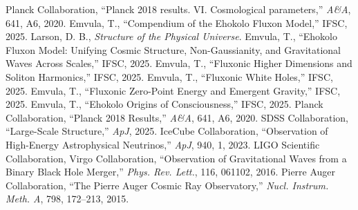 \documentclass[11pt]{article}
\begin{document}
\begin{thebibliography}{99}
 Planck Collaboration, ``Planck 2018 results. VI. Cosmological parameters,'' \textit{A\&A}, 641, A6, 2020.
 Emvula, T., ``Compendium of the Ehokolo Fluxon Model,'' IFSC, 2025.
 Larson, D. B., \textit{Structure of the Physical Universe}.
 Emvula, T., ``Ehokolo Fluxon Model: Unifying Cosmic Structure, Non-Gaussianity, and Gravitational Waves Across Scales,'' IFSC, 2025.
 Emvula, T., ``Fluxonic Higher Dimensions and Soliton Harmonics,'' IFSC, 2025.
 Emvula, T., ``Fluxonic White Holes,'' IFSC, 2025.
 Emvula, T., ``Fluxonic Zero-Point Energy and Emergent Gravity,'' IFSC, 2025.
 Emvula, T., ``Ehokolo Origins of Consciousness,'' IFSC, 2025.
 Planck Collaboration, ``Planck 2018 Results,'' \textit{A\&A}, 641, A6, 2020.
 SDSS Collaboration, ``Large-Scale Structure,'' \textit{ApJ}, 2025.
 IceCube Collaboration, ``Observation of High-Energy Astrophysical Neutrinos,'' \textit{ApJ}, 940, 1, 2023.
 LIGO Scientific Collaboration, Virgo Collaboration, ``Observation of Gravitational Waves from a Binary Black Hole Merger,'' \textit{Phys. Rev. Lett.}, 116, 061102, 2016.
 Pierre Auger Collaboration, ``The Pierre Auger Cosmic Ray Observatory,'' \textit{Nucl. Instrum. Meth. A}, 798, 172--213, 2015.
\end{thebibliography}
\end{document}
